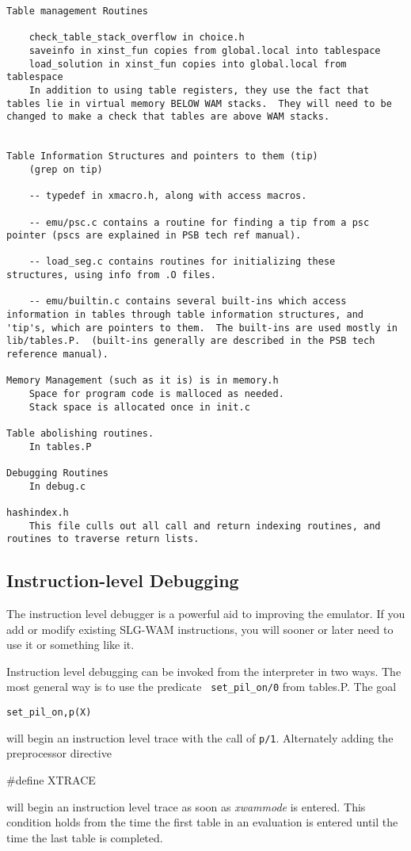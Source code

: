 \documentclass[11pt]{article}
\begin{document}
\begin{verbatim}
Table management Routines
	
	check_table_stack_overflow in choice.h
	saveinfo in xinst_fun copies from global.local into tablespace
	load_solution in xinst_fun copies into global.local from tablespace
	In addition to using table registers, they use the fact that
tables lie in virtual memory BELOW WAM stacks.  They will need to be
changed to make a check that tables are above WAM stacks.
	

Table Information Structures and pointers to them (tip)
	(grep on tip)

	-- typedef in xmacro.h, along with access macros.

	-- emu/psc.c contains a routine for finding a tip from a psc
pointer (pscs are explained in PSB tech ref manual).

	-- load_seg.c contains routines for initializing these
structures, using info from .O files.

	-- emu/builtin.c contains several built-ins which access
information in tables through table information structures, and
'tip's, which are pointers to them.  The built-ins are used mostly in
lib/tables.P.  (built-ins generally are described in the PSB tech
reference manual).

Memory Management (such as it is) is in memory.h
	Space for program code is malloced as needed.
	Stack space is allocated once in init.c

Table abolishing routines.
	In tables.P

Debugging Routines
	In debug.c

hashindex.h
	This file culls out all call and return indexing routines, and
routines to traverse return lists.

\end{verbatim}

\subsection{Instruction-level Debugging}

The instruction level debugger is a powerful aid to improving the
emulator.  If you add or modify existing SLG-WAM instructions, you
will sooner or later need to use it or something like it.

Instruction level debugging can be invoked from the interpreter in
two ways.  The most general way is to use the predicate {\tt
set\_pil\_on/0} from tables.P.  The goal
\begin{center} 
{\tt set\_pil\_on,p(X) }
\end{center}
will begin an instruction level trace with the call of {\tt p/1}.
Alternately adding the preprocessor directive
\begin{center}
\#define XTRACE
\end{center}
will begin an instruction level trace as soon as {\em xwammode} is
entered.  This condition holds from the time the first table in an
evaluation is entered until the time the last table is completed.
\end{document}

